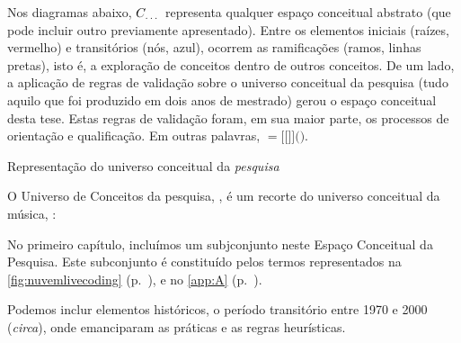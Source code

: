 Nos diagramas abaixo, $C_\emph{\ldots}$ representa qualquer espaço conceitual abstrato (que pode incluir outro previamente apresentado). Entre os elementos iniciais (raízes, vermelho) e transitórios (nós, azul), ocorrem as ramificações (ramos, linhas pretas), isto é, a exploração de conceitos dentro de outros conceitos. De um lado, a aplicação de regras de validação sobre o universo conceitual da pesquisa (tudo aquilo que foi produzido em dois anos de mestrado) gerou o espaço conceitual desta tese. Estas regras de validação foram, em sua maior parte, os processos de orientação e qualificação. Em outras palavras, $=[[$$]]($$)$.

\begin{example}{Representação do universo conceitual da \emph{pesquisa}}

O Universo de Conceitos da pesquisa, , é um recorte do universo conceitual da música, :


No primeiro capítulo, incluímos um subjconjunto neste Espaço Conceitual da Pesquisa. Este subconjunto é constituído pelos termos representados na \autoref{fig:nuvemlivecoding} (p.~\pageref{fig:nuvemlivecoding}), e no \autoref{app:A} (p.~\pageref{app:A}). 


Podemos inclur elementos históricos, o período transitório entre 1970 e 2000 (\emph{circa}), onde emanciparam as práticas e as regras heurísticas.  


\end{example}
